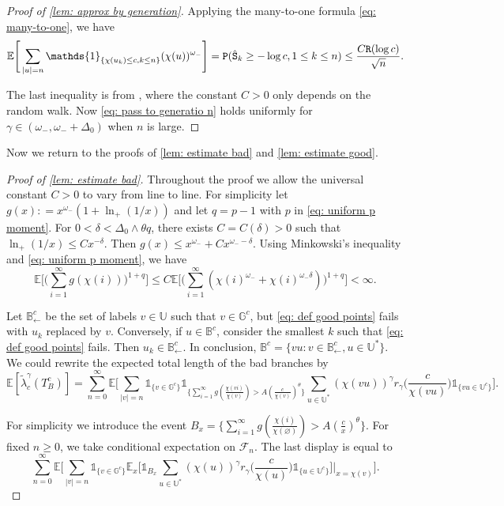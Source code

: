 \documentclass[12pt]{article}
\numberwithin{equation}{section}
\theoremstyle{plain}
\theoremstyle{definition}
\begin{document}
\begin{proof}[Proof of \cref{lem: approx by generation}]
\noindent Applying the many-to-one formula \eqref{eq: many-to-one}, we have
\[ \mathbb{E}\Bigg[\sum_{|u|=n}\mathds{1}_{\{\chi(u_k)\leq c, k\leq n\}} (\chi(u))^{\omega_-}\Bigg]={\tt P}({\hat{\tt S}}_k\geq -\log c, 1\leq k\leq n)\leq \frac{C{\tt R}(\log c)}{\sqrt{n}}. \]

\noindent The last inequality is from \cite[Equation (A.7)]{ShiZhan2016BRWE}, where the constant $C>0$ only depends on the random walk. Now \eqref{eq: pass to generatio n} holds uniformly for $\gamma\in(\omega_-, \omega_-+\Delta_0)$ when $n$ is large.

\end{proof}

Now we return to the proofs of \cref{lem: estimate bad} and \cref{lem: estimate good}.
\begin{proof}[Proof of \cref{lem: estimate bad}]
Throughout the proof we allow the universal constant $C>0$ to vary from line to line. For simplicity let $g(x): = x^{\omega_-}(1+\ln_+(1/x))$ and let $q=p-1$ with $p$ in \eqref{eq: uniform p moment}. For $0<\delta<\Delta_0\wedge\theta q$, there exists $C = C(\delta)>0$ such that $\ln_+(1/x)\leq Cx^{-\delta}$. Then $g(x)\leq x^{\omega_-}+Cx^{\omega_--\delta}$. Using Minkowski's inequality and \eqref{eq: uniform p moment}, we have
\begin{equation}\label{eq: sum g moment}
\mathbb{E}\bigg[\bigg(\sum^{\infty}_{i=1} g(\chi(i))\bigg)^{1+ q}\bigg] \leq C\mathbb{E} \bigg[\bigg(\sum^{\infty}_{i=1}(\chi(i)^{\omega_-}+\chi(i)^{\omega_-\delta})\bigg)^{1+ q}\bigg] < \infty.
\end{equation}

Let $\mathbb{B}^c_{\leftarrow}$ be the set of labels $v\in\mathbb{U}$ such that $v\in\mathbb{G}^c$, but \eqref{eq: def good points} fails with $u_k$ replaced by $v$. Conversely, if $u\in\mathbb{B}^c$, consider the smallest $k$ such that \eqref{eq: def good points} fails. Then $u_k\in\mathbb{B}^c_{\leftarrow}$. In conclusion, $\mathbb{B}^c = \{vu: v\in \mathbb{B}^c_{\leftarrow}, u\in\mathbb{U}^* \}$. We could rewrite the expected total length of the bad branches by
\[\mathbb{E}[\tilde{\lambda}^{\gamma}_c(T^c_B)] = \sum^{\infty}_{n=0}\mathbb{E}\Bigg[\sum_{|v|=n}\mathds{1}_{\{v\in\mathbb{G}^c\}} \mathds{1}_{\big\{\sum^{\infty}_{i=1}g(\frac{\chi(vi)}{\chi(v)}) > A(\frac{c}{\chi(v)})^{\theta}\big\}}\sum_{u\in\mathbb{U}^*}(\chi(vu))^{\gamma} r_{\gamma}\Big(\frac{c}{\chi(vu)}\Big) \mathds{1}_{\{vu\in\mathbb{U}^c\}}\Bigg]. \]

\noindent For simplicity we introduce the event $B_x = \{\sum^{\infty}_{i=1}g(\frac{\chi(i)}{\chi(\varnothing)})>A(\frac{c}{x})^{\theta}\}$. For fixed $n\geq 0$, we take conditional expectation on $\mathcal{F}_{n}$. The last display is equal to
\begin{equation}\label{eq: proof bad region 1}
\sum^{\infty}_{n=0}\mathbb{E} \Bigg[\sum_{|v|=n}\mathds{1}_{\{v\in\mathbb{G}^c\}} \mathbb{E}_x\bigg[\mathds{1}_{B_x} \sum_{u\in\mathbb{U}^*} (\chi(u))^{\gamma} r_{\gamma}\Big(\frac{c}{\chi(u)}\Big)\mathds{1}_{\{u\in\mathbb{U}^c\}}  \bigg]\Bigg|_{x=\chi(v)}\Bigg].
\end{equation}


\end{proof}
\end{document}
